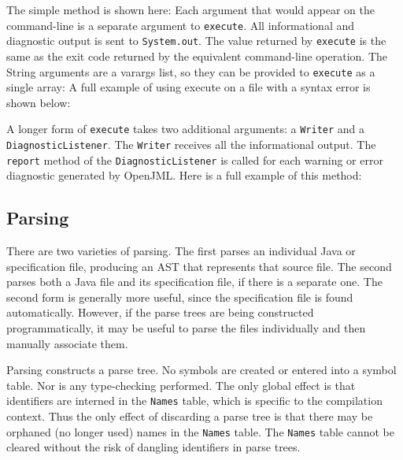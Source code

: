 The simple method is shown here:
\noindent
Each argument that would appear on the command-line is a separate argument to {\tt execute}.
All informational and diagnostic output is sent to {\tt System.out}.
The value returned by {\tt execute} is the same as the exit code returned by the equivalent command-line operation.
The String arguments are a varargs list, so they can be provided to {\tt execute} as a single array:
\noindent
A full example of using execute on a file with a syntax error is shown below:

\noindent
A longer form of {\tt execute} takes two additional arguments: a {\tt Writer} and a
{\tt DiagnosticListener}. The {\tt Writer} receives all the informational output.
The {\tt report} method of the {\tt DiagnosticListener} is called for each warning or
error diagnostic generated by OpenJML. Here is a full example of this method:


\subsection{Parsing}

There are two varieties of parsing. The first parses an individual Java or specification file, producing an AST that
represents that source file. The second parses both a Java file and its specification file, if there is a separate one.
The second form is generally more useful, since the specification file is found automatically. However, if the parse trees
are being constructed programmatically, it may be useful to parse the files individually and then manually associate them.

Parsing constructs a parse tree. No symbols are created or entered into a symbol table. Nor is any type-checking performed.
The only global effect is that identifiers are interned in the {\tt Names} table, which is specific to the compilation context.
Thus the only effect of discarding a parse tree is that there may be orphaned (no longer used) names in the {\tt Names} table.
The {\tt Names} table cannot be cleared without the risk of dangling identifiers in parse trees.

